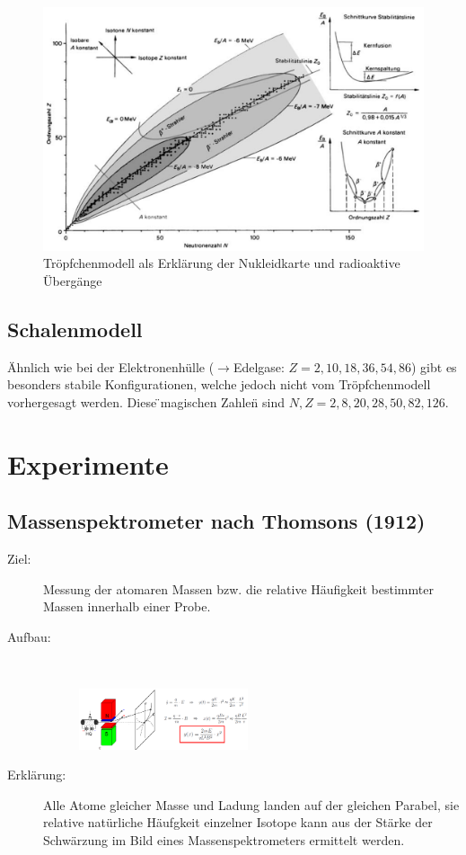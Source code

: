 \documentclass[twocolumn]{summery_4.1}
\begin{document}
\begin{figure}[H]
    \centering
    \includegraphics[width=.49\textwidth]{Kernenergien.png}
    \caption{Tröpfchenmodell als Erklärung der Nukleidkarte und radioaktive Übergänge}
\end{figure}

\subsection{Schalenmodell}
Ähnlich wie bei der Elektronenhülle (\(\to\)Edelgase: \(Z=2,10,18,36,54,86 \)) gibt es besonders stabile Konfigurationen, welche jedoch nicht vom Tröpfchenmodell vorhergesagt werden. Diese \"{}magischen Zahlen\"{} sind \(N,Z = 2,8,20,28,50,82,126\).

\section{Experimente}

\subsection{Massenspektrometer nach Thomsons (1912)}
\begin{description}
    \item[Ziel:] Messung der atomaren Massen bzw. die relative Häufigkeit bestimmter Massen innerhalb einer Probe.
    
    \item[Aufbau:]\,

    \begin{figure}[H]
        \centering
        \includegraphics[width=0.49\textwidth]{massenspektrometer_nach_thomson.png}
    \end{figure}
    
    \item[Erklärung:]
    Alle Atome gleicher Masse und Ladung landen auf der gleichen Parabel, sie relative natürliche Häufgkeit einzelner Isotope kann aus der Stärke der Schwärzung im Bild eines Massenspektrometers ermittelt werden.
\end{description}
\end{document}
